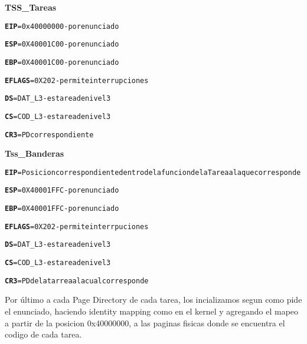 \begin{itemize}
	\item \textbf{TSS\_Tareas}
	\begin{alltt}
		\item  \textbf{EIP} = 0x40000000  - por enunciado
		\item  \textbf{ESP} = 0X40001C00  - por enunciado
		\item  \textbf{EBP} = 0X40001C00  - por enunciado
		\item  \textbf{EFLAGS} = 0X202  - permite interrupciones
		
		\item  \textbf{DS} = DAT_L3  - es tarea de nivel 3
		\item  \textbf{CS} = COD_L3  - es tarea de nivel 3
		
		\item  \textbf{CR3} = PD correspondiente
		
	\end{alltt}
	
	\item \textbf{Tss\_Banderas}
	\begin{alltt}
		\item \textbf{EIP} = Posicion correspondiente dentro de la funcion de la Tarea a la que corresponde
		\item \textbf{ESP} = 0X40001FFC  - por enunciado
		\item \textbf{EBP} = 0X40001FFC  - por enunciado
		\item \textbf{EFLAGS} = 0X202  - permite interrpuciones
		
		\item \textbf{DS} = DAT_L3  - es tarea de nivel 3
		\item \textbf{CS} = COD_L3  - es tarea de nivel 3
		
		\item \textbf{CR3} = PD de la tarrea a la cual corresponde 
	\end{alltt}
\end{itemize}


\par{Por último a cada Page Directory de cada tarea, los incializamos segun como pide el enunciado, haciendo identity mapping como en el kernel y agregando el mapeo a partir de la posicion 0x40000000, a las paginas fisicas donde se encuentra el codigo de cada tarea.}